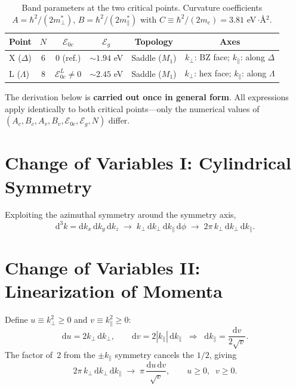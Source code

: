 \documentclass[11pt,a4paper]{article}
\newcommand{\E}{\mathcal{E}}              %
\newcommand{\Eoc}{\E_{0c}}
\newcommand{\Eg}{\E_g}
\newcommand{\kperp}{k_{\!\perp}}
\newcommand{\kpar}{k_{\!\parallel}}
\newcommand{\dd}{\mathrm{d}}
\begin{document}
\begin{table}[h]
  \centering
  \caption{Band parameters at the two critical points. Curvature coefficients $A=\hbar^2/(2m_\perp^*)$, $B=\hbar^2/(2m_\parallel^*)$ with $C\equiv\hbar^2/(2m_e)=3.81$ eV{\,$\cdot$}\AA$^2$.}\label{tab:params}
  \smallskip
  \begin{tabular}{@{}lccccc@{}}
    \toprule
    Point & $N$ & $\Eoc$ & $\Eg$ & Topology & Axes \\
    \midrule
    X ($\Delta$) & 6  & $0$ (ref.) & ${\sim}1.94$ eV & Saddle ($M_1$)
      & $\kperp$: BZ face;\; $\kpar$: along $\Delta$ \\
    L ($\Lambda$) & 8  & $\Eoc^L\neq 0$  & ${\sim}2.45$ eV & Saddle ($M_1$)
      & $\kperp$: hex face;\; $\kpar$: along $\Lambda$ \\
    \bottomrule
  \end{tabular}
\end{table}

The derivation below is \textbf{carried out once in general form}. All expressions apply identically to both critical points---only the numerical values of $(A_c, B_c, A_v, B_v, \Eoc, \Eg, N)$ differ.

\section{Change of Variables I: Cylindrical Symmetry}

Exploiting the azimuthal symmetry around the symmetry axis,
\begin{equation}
  \dd^3 k = \dd k_x\,\dd k_y\,\dd k_z
  \;\longrightarrow\;
  \kperp\,\dd\kperp\,\dd\kpar\,\dd\phi
  \;\longrightarrow\;
  2\pi\,\kperp\,\dd\kperp\,\dd\kpar.
\end{equation}

\section{Change of Variables II: Linearization of Momenta}

Define $u \equiv \kperp^2 \geq 0$ and $v \equiv \kpar^2 \geq 0$:
\begin{equation}
  \dd u = 2\kperp\,\dd\kperp, \qquad
  \dd v = 2|\kpar|\,\dd\kpar
  \;\;\Rightarrow\;\;
  \dd\kpar = \frac{\dd v}{2\sqrt{v}}.
\end{equation}
The factor of~2 from the $\pm\kpar$ symmetry cancels the $1/2$, giving
\begin{equation}\label{eq:measure-uv}
  2\pi\,\kperp\,\dd\kperp\,\dd\kpar
  \;\longrightarrow\;
  \pi\,\frac{\dd u\,\dd v}{\sqrt{v}},
  \qquad u\geq 0,\;\; v\geq 0.
\end{equation}
\end{document}
